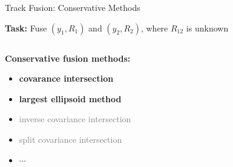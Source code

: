\documentclass[aspectratio=1610]{beamer}
\begin{document}
\begin{frame}{Track Fusion: Conservative Methods}

\textbf{Task:} Fuse $(y_1,R_1)$ and $(y_2,R_2)$, where $R_{12}$ is unknown

\vspace{2em}

\begin{columns}

\begin{column}{0.475\textwidth}

\textbf{Conservative fusion methods:}
\begin{itemize}
    \item \textcolor{clrci}{\textbf{covarance intersection}}
    \item \textcolor{clrle}{\textbf{largest ellipsoid method}}
    \item \textcolor{gray}{inverse covariance intersection}
    \item \textcolor{gray}{split covariance intersection}
    \item $\cdots$
\end{itemize}

\end{column}

\begin{column}{0.475\textwidth}
\begin{figure}
    \begin{tikzpicture}[scale=0.75]
        
    \end{tikzpicture}
\end{figure}
\end{column}

\end{columns}

\end{frame}
\end{document}
